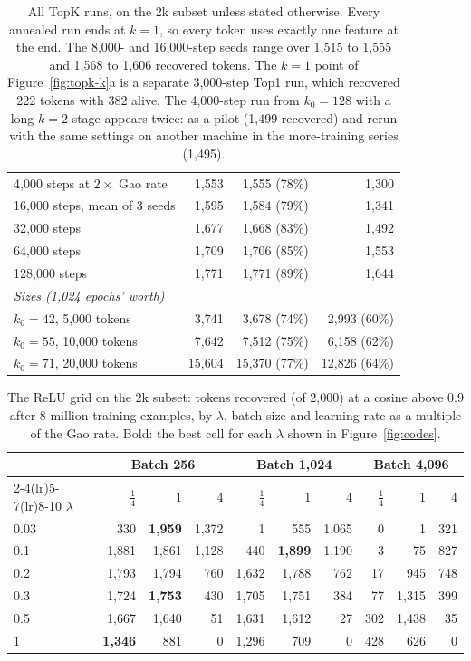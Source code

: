 \documentclass[11pt]{article}
\begin{document}
\begin{table}[h]
\begin{tabular}{@{}p{7.2cm}rrr@{}}
4,000 steps at $2\times$ Gao rate & 1,553 & 1,555 (78\%) & 1,300 \\
16,000 steps, mean of 3 seeds & 1,595 & 1,584 (79\%) & 1,341 \\
32,000 steps & 1,677 & 1,668 (83\%) & 1,492 \\
64,000 steps & 1,709 & 1,706 (85\%) & 1,553 \\
128,000 steps & 1,771 & 1,771 (89\%) & 1,644 \\
\midrule
\multicolumn{4}{l}{\emph{Sizes (1,024 epochs' worth)}} \\
$k_0 = 42$, 5,000 tokens & 3,741 & 3,678 (74\%) & 2,993 (60\%) \\
$k_0 = 55$, 10,000 tokens & 7,642 & 7,512 (75\%) & 6,158 (62\%) \\
$k_0 = 71$, 20,000 tokens & 15,604 & 15,370 (77\%) & 12,826 (64\%) \\
\bottomrule
\end{tabular}
\caption{All TopK runs, on the 2k subset unless stated otherwise. Every annealed run ends at $k = 1$, so every token uses exactly one feature at the end. The 8,000- and 16,000-step seeds range over 1,515 to 1,555 and 1,568 to 1,606 recovered tokens. The $k = 1$ point of Figure~\ref{fig:topk-k}a is a separate 3,000-step Top1 run, which recovered 222 tokens with 382 alive. The 4,000-step run from $k_0 = 128$ with a long $k = 2$ stage appears twice: as a pilot (1,499 recovered) and rerun with the same settings on another machine in the more-training series (1,495).}
\label{tab:topk}
\end{table}

\begin{table}[h]
\centering
\small
\begin{tabular}{lrrrrrrrrr}
\toprule
& \multicolumn{3}{c}{Batch 256} & \multicolumn{3}{c}{Batch 1,024} & \multicolumn{3}{c}{Batch 4,096} \\
\cmidrule(lr){2-4}\cmidrule(lr){5-7}\cmidrule(lr){8-10}
$\lambda$ & $\tfrac14$ & 1 & 4 & $\tfrac14$ & 1 & 4 & $\tfrac14$ & 1 & 4 \\
\midrule
0.03 & 330 & \textbf{1,959} & 1,372 & 1 & 555 & 1,065 & 0 & 1 & 321 \\
0.1 & 1,881 & 1,861 & 1,128 & 440 & \textbf{1,899} & 1,190 & 3 & 75 & 827 \\
0.2 & 1,793 & 1,794 & 760 & 1,632 & 1,788 & 762 & 17 & 945 & 748 \\
0.3 & 1,724 & \textbf{1,753} & 430 & 1,705 & 1,751 & 384 & 77 & 1,315 & 399 \\
0.5 & 1,667 & 1,640 & 51 & 1,631 & 1,612 & 27 & 302 & 1,438 & 35 \\
1 & \textbf{1,346} & 881 & 0 & 1,296 & 709 & 0 & 428 & 626 & 0 \\
\bottomrule
\end{tabular}
\caption{The ReLU grid on the 2k subset: tokens recovered (of 2,000) at a cosine above 0.9 after 8 million training examples, by $\lambda$, batch size and learning rate as a multiple of the Gao rate. Bold: the best cell for each $\lambda$ shown in Figure~\ref{fig:codes}.}
\label{tab:relu-grid}
\end{table}
\end{document}
